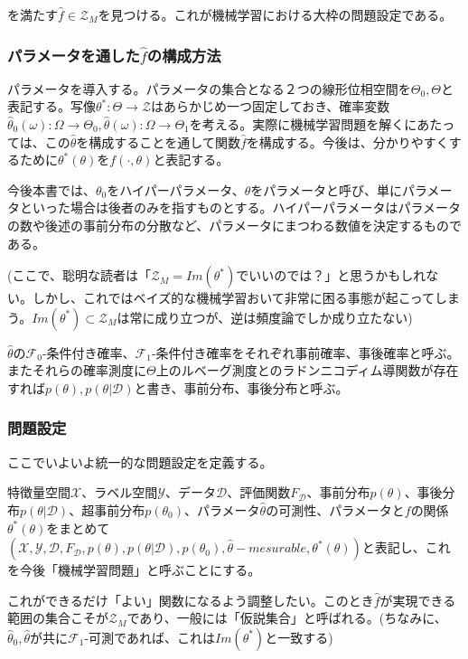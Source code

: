 \documentclass[dvipdfmx, a4paper]{jsarticle}
\begin{document}
を満たす$\hat{f}\in \mathcal{Z}_M$を見つける。これが機械学習における大枠の問題設定である。

\subsubsection{パラメータを通した$\hat{f}$の構成方法}
パラメータを導入する。パラメータの集合となる２つの線形位相空間を$\Theta_0,\Theta$と表記する。写像$\theta^*:\Theta\to\mathcal{Z}$はあらかじめ一つ固定しておき、確率変数$\hat{\theta}_0(\omega)\colon\Omega\to\Theta_0,\hat{\theta}(\omega)\colon\Omega\to\Theta_1$を考える。実際に機械学習問題を解くにあたっては、この$\hat{\theta}$を構成することを通して関数$\hat{f}$を構成する。今後は、分かりやすくするために$\theta^*(\theta)$を$f(\cdot,\theta)$と表記する。

今後本書では、$\theta_0$をハイパーパラメータ、$\theta$をパラメータと呼び、単にパラメータといった場合は後者のみを指すものとする。ハイパーパラメータはパラメータの数や後述の事前分布の分散など、パラメータにまつわる数値を決定するものである。

(ここで、聡明な読者は「$\mathcal{Z}_M=Im(\theta^*)$でいいのでは？」と思うかもしれない。しかし、これではベイズ的な機械学習おいて非常に困る事態が起こってしまう。$Im(\theta^*)\subset\mathcal{Z}_M$は常に成り立つが、逆は頻度論でしか成り立たない)

$\hat{\theta}$の$\mathcal{F}_0$-条件付き確率、$\mathcal{F}_1$-条件付き確率をそれぞれ事前確率、事後確率と呼ぶ。またそれらの確率測度に$\Theta$上のルベーグ測度とのラドンニコディム導関数が存在すれば$p(\theta),p(\theta|\mathcal{D})$と書き、事前分布、事後分布と呼ぶ。

\subsubsection{問題設定}
ここでいよいよ統一的な問題設定を定義する。

特徴量空間$\mathcal{X}$、ラベル空間$\mathcal{Y}$、データ$\mathcal{D}$、評価関数$F_\mathcal{D}$、事前分布$p(\theta)$、事後分布$p(\theta|\mathcal{D})$、超事前分布$p(\theta_0)
$、パラメータ$\hat{\theta}$の可測性、パラメータと$f$の関係$\theta^*(\theta)$をまとめて$(\mathcal{X},\mathcal{Y},\mathcal{D},F_\mathcal{D},p(\theta),p(\theta|\mathcal{D}),p(\theta_0),\hat{\theta}-mesurable,\theta^*(\theta))$と表記し、これを今後「機械学習問題」と呼ぶことにする。

これができるだけ「よい」関数になるよう調整したい。このとき$\hat{f}$が実現できる範囲の集合こそが$\mathcal{Z}_M$であり、一般には「仮説集合」と呼ばれる。(ちなみに、$\hat{\theta}_0,\hat{\theta}$が共に$\mathcal{F}_1$-可測であれば、これは$Im(\theta^*)$と一致する)
\end{document}
